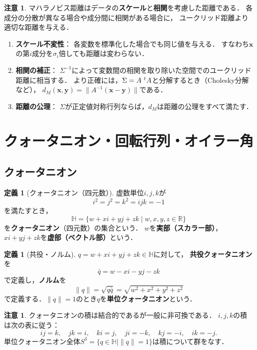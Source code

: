 \documentclass[dvipdfmx,a4paper,12pt]{jsarticle}
\theoremstyle{definition}
\newtheorem{definition}[theorem]{定義}
\newtheorem{remark}[theorem]{注意}
\begin{document}
\begin{remark}
    マハラノビス距離はデータの\textbf{スケール}と\textbf{相関}を考慮した距離である．
    各成分の分散が異なる場合や成分間に相関がある場合に，
    ユークリッド距離より適切な距離を与える．
    \begin{enumerate}
        \item \textbf{スケール不変性}：
        各変数を標準化した場合でも同じ値を与える．
        すなわち$\bm{x}$の第$i$成分を$\sigma_i$倍しても距離は変わらない．
        \item \textbf{相関の補正}：
        $\Sigma^{-1}$によって変数間の相関を取り除いた空間でのユークリッド距離に相当する．
        より正確には，$\Sigma=A\,\prescript{t}{}{}A$と分解するとき（Cholesky分解など），
        $d_M(\bm{x},\bm{y})=\|A^{-1}(\bm{x}-\bm{y})\|$である．
        \item \textbf{距離の公理}：
        $\Sigma$が正定値対称行列ならば，$d_M$は距離の公理をすべて満たす．
    \end{enumerate}
\end{remark}




\section{クォータニオン・回転行列・オイラー角}

\subsection{クォータニオン}

\begin{definition}[クォータニオン（四元数）]
    虚数単位$i,j,k$が
    $$i^2=j^2=k^2=ijk=-1$$
    を満たすとき，
    $$\mathbb{H}=\{w+xi+yj+zk\mid w,x,y,z\in\mathbb{R}\}$$
    を\textbf{クォータニオン}（四元数）の集合という．
    $w$を\textbf{実部（スカラー部）}，$xi+yj+zk$を\textbf{虚部（ベクトル部）}という．
\end{definition}

\begin{definition}[共役・ノルム]
    $q=w+xi+yj+zk\in\mathbb{H}$に対して，
    \textbf{共役クォータニオン}を
    $$\bar{q}=w-xi-yj-zk$$
    で定義し，\textbf{ノルム}を
    $$\|q\|=\sqrt{q\bar{q}}=\sqrt{w^2+x^2+y^2+z^2}$$
    で定義する．$\|q\|=1$のとき$q$を\textbf{単位クォータニオン}という．
\end{definition}

\begin{remark}
    クォータニオンの積は結合的であるが一般に非可換である．
    $i,j,k$の積は次の表に従う：
    $$ij=k,\quad jk=i,\quad ki=j,\quad ji=-k,\quad kj=-i,\quad ik=-j.$$
    単位クォータニオン全体$S^3=\{q\in\mathbb{H}\mid\|q\|=1\}$は積について群をなす．
\end{remark}
\end{document}
